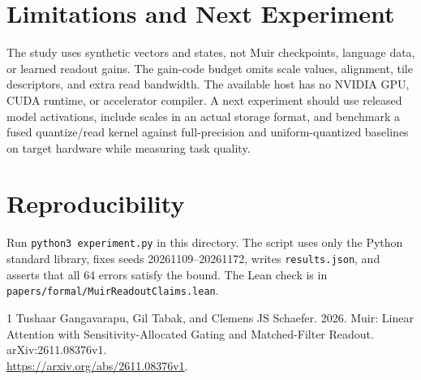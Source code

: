 \documentclass[11pt]{article}
\begin{document}
\section{Limitations and Next Experiment}
The study uses synthetic vectors and states, not Muir checkpoints, language data, or learned readout gains. The gain-code budget omits scale values, alignment, tile descriptors, and extra read bandwidth. The available host has no NVIDIA GPU, CUDA runtime, or accelerator compiler. A next experiment should use released model activations, include scales in an actual storage format, and benchmark a fused quantize/read kernel against full-precision and uniform-quantized baselines on target hardware while measuring task quality.
\section*{Reproducibility}
Run \texttt{python3 experiment.py} in this directory. The script uses only the Python standard library, fixes seeds 20261109--20261172, writes \texttt{results.json}, and asserts that all 64 errors satisfy the bound. The Lean check is in \texttt{papers/formal/MuirReadoutClaims.lean}.
\begin{thebibliography}{1}
Tushaar Gangavarapu, Gil Tabak, and Clemens JS Schaefer. 2026.
Muir: Linear Attention with Sensitivity-Allocated Gating and Matched-Filter Readout. arXiv:2611.08376v1.\\
\url{https://arxiv.org/abs/2611.08376v1}.
\end{thebibliography}
\end{document}
